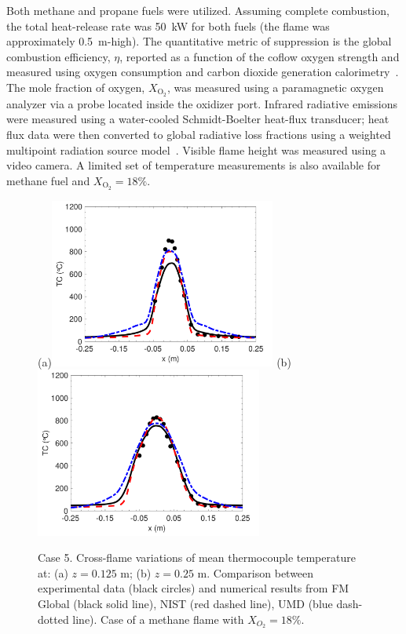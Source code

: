 Both methane and propane fuels were utilized. Assuming complete combustion, the total heat-release rate was 50~kW for both fuels (the flame was approximately 0.5~m-high). The quantitative metric of suppression is the global combustion efficiency, $\eta$, reported as a function of the coflow oxygen strength and measured using oxygen consumption and carbon dioxide generation calorimetry~\cite{Case5_EXP_3}. The mole fraction of oxygen, $X_{\text{O}_2}$, was measured using a paramagnetic oxygen analyzer via a probe located inside the oxidizer port. Infrared radiative emissions were measured using a water-cooled Schmidt-Boelter heat-flux transducer; heat flux data were then converted to global radiative loss fractions using a weighted multipoint radiation source model~\cite{Case5_EXP_2}. Visible flame height was measured using a video camera. A limited set of temperature measurements is also available for methane fuel and $X_{\text{O}_2} = 18 \%$.

\begin{figure}
\centering
(a)\includegraphics[height=2.2in]{Figures/Case5-Fig2a.pdf}
(b)\includegraphics[height=2.2in]{Figures/Case5-Fig2b.pdf}
\caption{Case 5. Cross-flame variations of mean thermocouple temperature at: (a) $z = 0.125$ m; (b) $z = 0.25$ m. Comparison between experimental data (black circles) and numerical results from FM Global (black solid line), NIST (red dashed line), UMD (blue dash-dotted line). Case of a methane flame with $X_{O_2} = 18\%$. 
\label{fig:Case5-Fig2}}
\end{figure}

